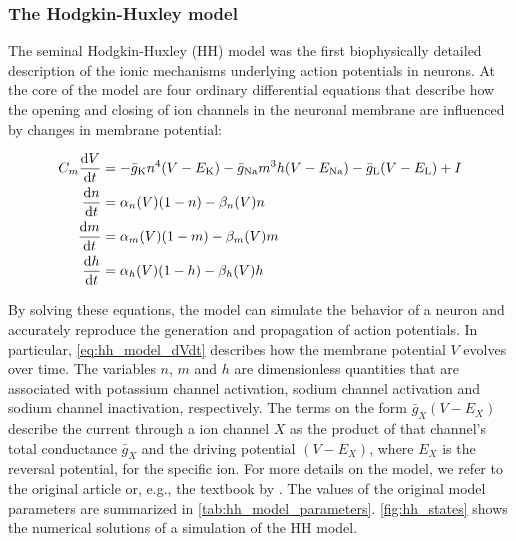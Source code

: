 \subsubsection*{The Hodgkin-Huxley model}

The seminal Hodgkin-Huxley (HH) model \citep{HH1952} was the first biophysically detailed description of the ionic mechanisms underlying  action potentials in neurons. At the core of the model are four ordinary differential equations that describe how the opening and closing of ion channels in the neuronal membrane are influenced by changes in membrane potential: 

\begin{subequations}\label{eq:hh_model}
    \begin{align}
    C_m \frac{\dd{V}}{\dd{t}} &= - \bar{g}_\mathrm{K} n^4 \qty(V - E_\mathrm{K}) - \bar{g}_\mathrm{Na} m^3h \qty(V - E_\mathrm{Na}) - \bar{g}_\mathrm{L} \qty(V - E_\mathrm{L}) + I
    \label{eq:hh_model_dVdt}
    \\
    \frac{\dd{n}}{\dd{t}} &= \alpha_n (V) (1-n) - \beta_n (V) n 
    \label{eq:hh_model_dndt}
    \\
    \frac{\dd{m}}{\dd{t}} &= \alpha_m (V) (1-m) - \beta_m (V) m
    \label{eq:hh_model_dmdt}
    \\
    \frac{\dd{h}}{\dd{t}} &= \alpha_h (V) (1-h) - \beta_h (V) h
    \label{eq:hh_model_dhdt}
    \end{align}
\end{subequations}

By solving these equations, the model can simulate the behavior of a neuron and accurately reproduce the generation and propagation of action potentials. In particular, \autoref{eq:hh_model_dVdt} describes how the membrane potential $V$ evolves over time. The variables $n$, $m$ and $h$ are dimensionless quantities that are associated with potassium channel activation, sodium channel activation and sodium channel inactivation, respectively. The terms on the form $\bar{g}_X (V-E_X)$ describe the current through a ion channel $X$ as the product of that channel's total conductance $\bar{g}_X$ and the driving potential $(V-E_X)$, where $E_X$ is the reversal potential, for the specific ion. For more details on the model, we refer to the original article or, e.g., the textbook by \cite{Sterratt}. The values of the original model parameters are summarized in \autoref{tab:hh_model_parameters}. \autoref{fig:hh_states} shows the numerical solutions of a simulation of the HH model. 

